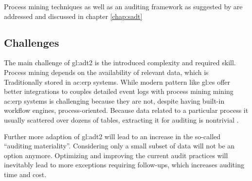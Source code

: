 Process mining techniques as well as an auditing framework as suggested by \citep{5427384} are addressed and discussed in chapter \ref{chap:sadt}

\subsection{Challenges}


The main challenge of \gls{gl:adt2} is the introduced complexity and required skill. Process mining depends on the availability of relevant data, which is Traditionally stored in \gls{ac:erp} systems. While modern pattern like \gls{gl:es} offer better integrations to couples detailed event logs with process mining mining \gls{ac:erp} systems is challenging because they are not, despite having built-in workflow engines, process-oriented. Because data related to a particular process it usually scattered over dozens of tables, extracting it for auditing is nontrivial \citep{5427384}.

Further more adaption of \gls{gl:adt2} will lead to an increase in the so-called “auditing materiality”. Considering only a small subset of data will not be an option anymore. Optimizing and improving the current audit practices will inevitably lead to more exceptions requiring follow-ups, which increases auditing time and cost.

